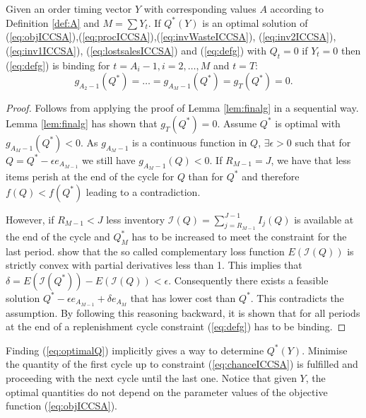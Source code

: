 \begin{proposition}
\label{prop:optimizeY}
Given an order timing vector $Y$ with corresponding values $A$ according to Definition \ref{def:A} and $M=\sum Y_t$.   If $Q^*(Y)$ is an optimal solution of (\ref{eq:objICCSA}),(\ref{eq:procICCSA}),(\ref{eq:invWasteICCSA}), (\ref{eq:inv2ICCSA}), (\ref{eq:inv1ICCSA}), (\ref{eq:lostsalesICCSA}) and (\ref{eq:defg}) with $Q_t= 0$ if $Y_t=0$ then (\ref{eq:defg}) is binding for $t=A_i -1, i=2,\ldots,M$ and $t=T$:
\begin{equation}
\label{eq:optimalQ}
 g_{A_2-1}(Q^*) = \ldots = g_{A_M-1}(Q^*)= g_{T}(Q^*)=0 .%
\end{equation}
\end{proposition}
\begin{proof}
Follows from applying the proof of Lemma \ref{lem:finalg} in a sequential way. Lemma \ref{lem:finalg} has shown that $g_{T}(Q^*)=0$. Assume $Q^*$ is optimal with $g_{A_M-1}(Q^*)<0$. As $g_{A_M-1}$ is a continuous function in $Q$, $\exists \epsilon>0$ such that for $Q=Q^*-\epsilon e_{A_{M-1}}$ 
we still have $g_{A_M-1}(Q)<0$. If $R_{M-1}=J$, we have that less items perish at the end of the cycle for $Q$ than for $Q^*$ and therefore $f(Q)<f(Q^*)$ leading to a contradiction.

However, if $R_{M-1}<J$ less inventory $\mathcal{I}(Q)=\sum_{j=R_{M-1}}^{J-1}I_j(Q)$ is available at the end of the cycle and $Q^*_M$ has to be increased to meet the constraint for the last period. \cite{Rossi14} show that the so called complementary loss function $E(\mathcal{I}(Q))$ is strictly convex with partial derivatives less than 1. This implies that $\delta= E(\mathcal{I}(Q^*))-E(\mathcal{I}(Q))<\epsilon$. Consequently there exists a feasible solution $Q^* -\epsilon e_{A_{M-1}} +\delta e_{A_{M}}$ that has lower cost than $Q^*$. This contradicts the assumption. By following this reasoning backward, it is shown that for all periods at the end of a replenishment cycle constraint (\ref{eq:defg}) has to be binding.%
\end{proof}

Finding (\ref{eq:optimalQ}) implicitly gives a way to determine $Q^*(Y)$. Minimise the quantity of the first cycle up to constraint (\ref{eq:chanceICCSA}) is fulfilled and proceeding with the next cycle until the last one. Notice that given $Y$, the optimal quantities do not depend on the parameter values of the objective function (\ref{eq:objICCSA}).



